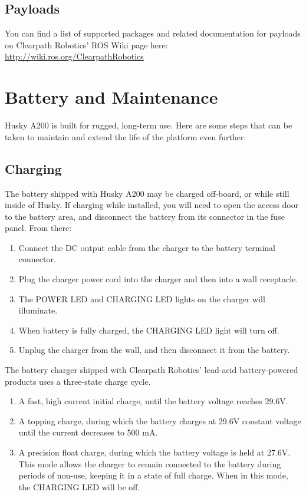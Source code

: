 \documentclass[]{clearpath-latex/clearpath-manual}
\begin{document}
\subsection{Payloads}
You can find a list of supported packages and related documentation for payloads on Clearpath Robotics’ 
ROS Wiki page here: \url{http://wiki.ros.org/ClearpathRobotics}
\newpage

\section{Battery and Maintenance}
Husky A200 is built for rugged, long-term use. Here are some steps that can be 
taken to maintain and extend the life of the platform even further.

\subsection{Charging}
The battery shipped with Husky A200 may be charged off-board, or while still inside of Husky. 
If charging while installed, you will need to open the access door to the battery area, and 
disconnect the battery from its connector in the fuse panel. From there:

\begin{enumerate}
	\item Connect the DC output cable from the charger to the battery terminal connector.
	\item Plug the charger power cord into the charger and then into a wall receptacle.
	\item The POWER LED and CHARGING LED lights on the charger will illuminate.
	\item When battery is fully charged, the CHARGING LED light will turn off. 
	\item Unplug the charger from the wall, and then disconnect it from the battery.
\end{enumerate}

The battery charger shipped with Clearpath Robotics’ lead-acid 
battery-powered products uses a three-state charge cycle.

\begin{enumerate}
		\item A fast, high current initial charge, until the battery voltage reaches 29.6V.
		\item A topping charge, during which the battery charges at 29.6V constant voltage 
		until the current decreases to 500 mA.
		\item A precision float charge, during which the battery voltage is held at 27.6V. 
		This mode allows the charger to remain connected to the battery during periods of non-use, 
		keeping it in a state of full charge. When in this mode, the CHARGING LED will be off.
\end{enumerate}		
\end{document}
